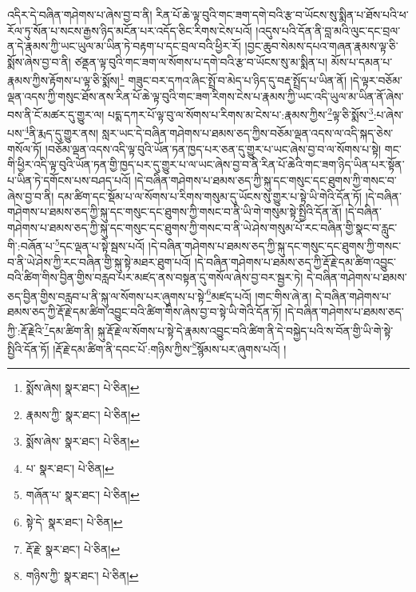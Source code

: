 འདིར་དེ་བཞིན་གཤེགས་པ་ཞེས་བྱ་བ་ནི། རིན་པོ་ཆེ་ལྟ་བུའི་གང་ཟག་དགེ་བའི་རྩ་བ་ཡོངས་སུ་སྨིན་པ་ཐོས་པའི་ཕ་རོལ་ཏུ་སོན་པ་སངས་རྒྱས་ཉིད་མངོན་པར་འདོད་ཅིང་རིགས་ངེས་པའོ། །འདུས་པའི་དོན་ནི་བླ་མའི་ལུང་དང་བྲལ་ན་དེ་རྣམས་ཀྱི་ཡང་ཡུལ་མ་ཡིན་ཏེ་བརྟག་པ་དང་བྲལ་བའི་ཕྱིར་རོ། །བྱང་ཆུབ་སེམས་དཔའ་གཞན་རྣམས་ལྟ་ཅི་སྨོས་ཞེས་བྱ་བ་ནི། ཙནྡན་ལྟ་བུའི་གང་ཟག་ལ་སོགས་པ་དགེ་བའི་རྩ་བ་ཡོངས་སུ་མ་སྨིན་པ། མོས་པ་དམན་པ་རྣམས་ཀྱིས་རྟོགས་པ་ལྟ་ཅི་སྨོས།\footnote{སྨོས་ཞེས།  སྣར་ཐང་།  པེ་ཅིན། } གཟུང་བར་དཀའ་ཞིང་སྤྲོ་བ་མེད་པ་ཉིད་དུ་བརྡ་སྤྲོད་པ་ཡིན་ནོ། །དེ་ལྟར་བཅོམ་ལྡན་འདས་ཀྱི་གསུང་ཐོས་ནས་རིན་པོ་ཆེ་ལྟ་བུའི་གང་ཟག་རིགས་ངེས་པ་རྣམས་ཀྱི་ཡང་འདི་ཡུལ་མ་ཡིན་ནོ་ཞེས་བས་ནི་ངོ་མཚར་དུ་གྱུར་ལ། པདྨ་དཀར་པོ་ལྟ་བུ་ལ་སོགས་པ་རིགས་མ་ངེས་པ་:རྣམས་ཀྱིས་\footnote{རྣམས་ཀྱི་  སྣར་ཐང་།  པེ་ཅིན། }ལྟ་ཅི་སྨོས་\footnote{སྨོས་ཞེས་  སྣར་ཐང་།  པེ་ཅིན། }:པ་ཞེས་པས་\footnote{པ་  སྣར་ཐང་།  པེ་ཅིན། }ནི་རྨད་དུ་གྱུར་ནས། སླར་ཡང་དེ་བཞིན་གཤེགས་པ་ཐམས་ཅད་ཀྱིས་བཅོམ་ལྡན་འདས་ལ་འདི་སྐད་ཅེས་གསོལ་ཏོ། །བཅོམ་ལྡན་འདས་འདི་ལྟ་བུའི་ཡོན་ཏན་ཁྱད་པར་ཅན་དུ་གྱུར་པ་ཡང་ཞེས་བྱ་བ་ལ་སོགས་པ་སྟེ། གང་གི་ཕྱིར་འདི་ལྟ་བུའི་ཡོན་ཏན་གྱི་ཁྱད་པར་དུ་གྱུར་པ་ལ་ཡང་ཞེས་བྱ་བ་ནི་རིན་པོ་ཆེའི་གང་ཟག་ཉིད་ཡིན་པར་སྟོན་པ་ཡིན་ཏེ་དགོངས་པས་བཤད་པའོ། །དེ་བཞིན་གཤེགས་པ་ཐམས་ཅད་ཀྱི་སྐུ་དང་གསུང་དང་ཐུགས་ཀྱི་གསང་བ་ཞེས་བྱ་བ་ནི། དམ་ཚིག་དང་སྡོམ་པ་ལ་སོགས་པ་རིགས་གསུམ་དུ་ཡོངས་སུ་གྱུར་པ་སྟེ་ཡི་གེའི་དོན་ཏོ། །དེ་བཞིན་གཤེགས་པ་ཐམས་ཅད་ཀྱི་སྐུ་དང་གསུང་དང་ཐུགས་ཀྱི་གསང་བ་ནི་ཡི་གེ་གསུམ་སྟེ་སྤྱིའི་དོན་ནོ། །དེ་བཞིན་གཤེགས་པ་ཐམས་ཅད་ཀྱི་སྐུ་དང་གསུང་དང་ཐུགས་ཀྱི་གསང་བ་ནི་ཡེ་ཤེས་གསུམ་པོ་རང་བཞིན་གྱི་སྣང་བ་རླུང་གི་:བཞོན་པ་\footnote{གཞོན་པ་  སྣར་ཐང་།  པེ་ཅིན། }དང་ལྡན་པ་སྟེ་སྦས་པའོ། །དེ་བཞིན་གཤེགས་པ་ཐམས་ཅད་ཀྱི་སྐུ་དང་གསུང་དང་ཐུགས་ཀྱི་གསང་བ་ནི་ཡེ་ཤེས་ཀྱི་རང་བཞིན་གྱི་སྐུ་སྟེ་མཐར་ཐུག་པའོ། །དེ་བཞིན་གཤེགས་པ་ཐམས་ཅད་ཀྱི་རྡོ་རྗེ་དམ་ཚིག་འབྱུང་བའི་ཚིག་གིས་བྱིན་གྱིས་བརླབ་པར་མཛད་ནས་བསྟན་དུ་གསོལ་ཞེས་བྱ་བར་སྦྱར་ཏེ། དེ་བཞིན་གཤེགས་པ་ཐམས་ཅད་བྱིན་གྱིས་བརླབ་པ་ནི་སྐུ་ལ་སོགས་པར་ཞུགས་པ་སྟེ་\footnote{སྟེ་དེ་  སྣར་ཐང་།  པེ་ཅིན། }མཛད་པའོ། །གང་གིས་ཞེ་ན། དེ་བཞིན་གཤེགས་པ་ཐམས་ཅད་ཀྱི་རྡོ་རྗེ་དམ་ཚིག་འབྱུང་བའི་ཚིག་གིས་ཞེས་བྱ་བ་སྟེ་ཡི་གེའི་དོན་ཏོ། །དེ་བཞིན་གཤེགས་པ་ཐམས་ཅད་ཀྱི་:རྡོ་རྗེའི་\footnote{རྡོ་རྗེ་  སྣར་ཐང་།  པེ་ཅིན། }དམ་ཚིག་ནི། སྐུ་རྡོ་རྗེ་ལ་སོགས་པ་སྟེ་དེ་རྣམས་འབྱུང་བའི་ཚིག་ནི་དེ་བསྐྱེད་པའི་ས་བོན་གྱི་ཡི་གེ་སྟེ་སྤྱིའི་དོན་ཏོ། །རྡོ་རྗེ་དམ་ཚིག་ནི་དབང་པོ་:གཉིས་ཀྱིས་\footnote{གཉིས་ཀྱི་  སྣར་ཐང་།  པེ་ཅིན། }སྙོམས་པར་ཞུགས་པའོ། །
